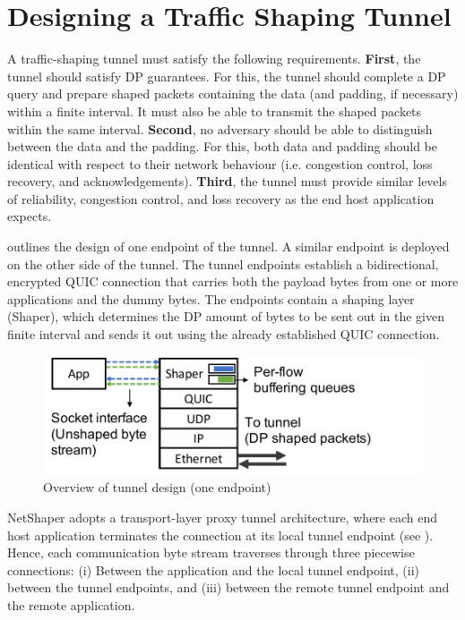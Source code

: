 \section{Designing a Traffic Shaping Tunnel}
\label{sec:netshaper-designing-traffic-shaping-tunnel}

A traffic-shaping tunnel must satisfy the following requirements.
\textbf{First}, the tunnel should satisfy DP guarantees.
For this, the tunnel should complete a DP query and prepare shaped packets containing the data (and padding, if necessary) within a finite interval.
It must also be able to transmit the shaped packets within the same interval.
\textbf{Second}, no adversary should be able to distinguish between the data and the padding.
For this, both data and padding should be identical with respect to their network behaviour (i.e. congestion control, loss recovery, and acknowledgements).
\textbf{Third}, the tunnel must provide similar levels of reliability, congestion control, and loss recovery as the end host application expects.

 outlines the design of one endpoint of the tunnel. A similar endpoint is deployed on the other side of the tunnel.
The tunnel endpoints establish a bidirectional, encrypted QUIC connection that carries both the payload bytes from one or more applications and the dummy bytes.
The endpoints contain a shaping layer (Shaper), which determines the DP amount of bytes to be sent out in the given finite interval and sends it out using the already established QUIC connection.

\begin{figure}[!htb]
    \centering
    \includegraphics[width=\columnwidth]{figures/netshaper/tunnel-endpoint-design.pdf}
    \caption{Overview of tunnel design (one endpoint)}
    \label{fig:tunnel-endpoint-design}
\end{figure}

NetShaper adopts a transport-layer proxy tunnel architecture, where each end host application terminates the connection at its local tunnel endpoint (see ). Hence, each communication byte stream traverses through three piecewise connections: (i) Between the application and the local tunnel endpoint, (ii) between the tunnel endpoints, and (iii) between the remote tunnel endpoint and the remote application.

